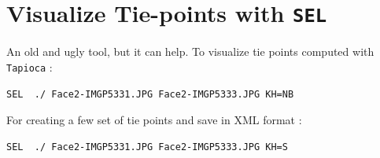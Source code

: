
\section{Visualize Tie-points with {\tt SEL}}

An old and ugly tool, but it can help. To visualize tie points computed with
{\tt Tapioca} :

\begin{verbatim}
SEL  ./ Face2-IMGP5331.JPG Face2-IMGP5333.JPG KH=NB
\end{verbatim}

For creating a few set of tie points and save in XML format :

\begin{verbatim}
SEL  ./ Face2-IMGP5331.JPG Face2-IMGP5333.JPG KH=S
\end{verbatim}



